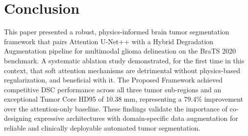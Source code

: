 \documentclass[conference]{IEEEtran}
\begin{document}
\section{Conclusion}
\label{sec:conclusion}
This paper presented a robust, physics-informed brain tumor segmentation framework that pairs Attention U-Net++ with a Hybrid Degradation Augmentation pipeline for multimodal glioma delineation on the BraTS 2020 benchmark. A systematic ablation study demonstrated, for the first time in this context, that soft attention mechanisms are detrimental without physics-based regularization, and beneficial with it. The Proposed Framework achieved competitive DSC performance across all three tumor sub-regions and an exceptional Tumor Core HD95 of 10.38 mm, representing a 79.4\% improvement over the attention-only baseline. These findings validate the importance of co-designing expressive architectures with domain-specific data augmentation for reliable and clinically deployable automated tumor segmentation.



\end{document}
